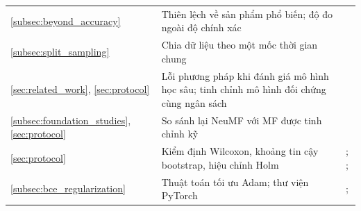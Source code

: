 \begin{xltabular}{\textwidth}{>{\raggedright\arraybackslash}p{2.7cm} X >{\raggedright\arraybackslash}p{4.4cm}}
    \ref{subsec:beyond_accuracy} & Thiên lệch về sản phẩm phổ biến; độ đo ngoài độ chính xác & \textcite{vargas2011novelty} \\
    \ref{subsec:split_sampling} & Chia dữ liệu theo một mốc thời gian chung & \textcite{meng2020splitting} \\
    \ref{sec:related_work}, \ref{sec:protocol} & Lỗi phương pháp khi đánh giá mô hình học sâu; tinh chỉnh mô hình đối chứng cùng ngân sách & \textcite{dacrema2019progress} \\
    \ref{subsec:foundation_studies}, \ref{sec:protocol} & So sánh lại NeuMF với MF được tinh chỉnh kỹ & \textcite{rendle2020ncfmf} \\
    \ref{sec:protocol} & Kiểm định Wilcoxon, khoảng tin cậy bootstrap, hiệu chỉnh Holm & \textcite{wilcoxon1945}; \textcite{efron1993bootstrap}; \textcite{holm1979} \\
    \ref{subsec:bce_regularization} & Thuật toán tối ưu Adam; thư viện PyTorch & \textcite{kingma2014adam}; \textcite{paszke2019pytorch} \\
\end{xltabular}
\endgroup
